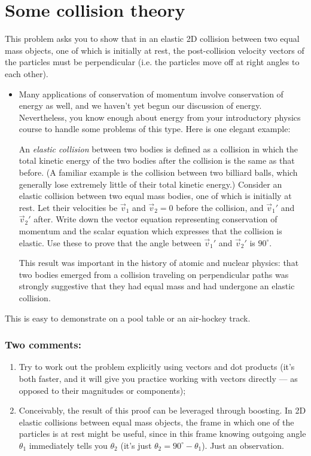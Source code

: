 \documentclass[12pt]{article}
\begin{document}
\newpage

\section{Some collision theory}

This problem asks you to show that in an elastic 2D collision between two equal mass objects, one of which is initially at rest, the post-collision velocity vectors of the particles must be perpendicular (i.e. the particles move off at right angles to each other).

\begin{itemize}
    \item[T1 3.5] Many applications of conservation of momentum involve conservation of energy as well, and we haven’t yet begun our discussion of energy. Nevertheless, you know enough about energy from your introductory physics course to handle some problems of this type. Here is one elegant example: 

    An \textit{elastic collision} between two bodies is defined as a collision in which the total kinetic energy of the two bodies after the collision is the same as that before. (A familiar example is the collision between two billiard balls, which generally lose extremely little of their total kinetic energy.) Consider an elastic collision between two equal mass bodies, one of which is initially at rest. Let their velocities be $\vec{v}_1$ and $\vec{v}_2 = 0$ before the collision, and $\vec{v}_1'$ and $\vec{v}_2'$ after. Write down the vector equation representing conservation of momentum and the scalar equation which expresses that the collision is elastic. Use these to prove that the angle between $\vec{v}_1'$ and $\vec{v}_2'$ is $90^\circ$. 
    
    This result was important in the history of atomic and nuclear physics: that two bodies emerged from a collision traveling on perpendicular paths was strongly suggestive that they had equal mass and had undergone an elastic collision.
    
\end{itemize}

This is easy to demonstrate on a pool table or an air-hockey track.

\subsubsection*{Two comments:}
\begin{enumerate}
    \item Try to work out the problem explicitly using vectors and dot products (it’s both faster, and it will give you practice working with vectors directly — as opposed to their magnitudes or components);
    
    \item Conceivably, the result of this proof can be leveraged through boosting. In 2D elastic collisions between equal mass objects, the frame in which one of the particles is at rest might be useful, since in this frame knowing outgoing angle $\theta_1$ immediately tells you $\theta_2$ (it’s just $\theta_2 = 90^\circ - \theta_1$). Just an observation.
\end{enumerate}
\end{document}
